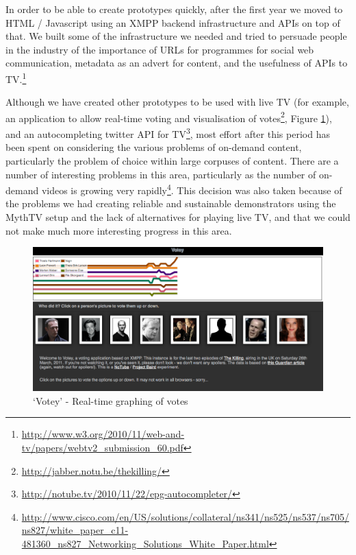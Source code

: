 \documentclass{notube}
\begin{document}
In order to be able to create prototypes quickly, after the first year we moved to HTML / Javascript using an XMPP backend infrastructure and APIs on top of that. We built some of the infrastructure we needed and tried to persuade people in the industry of the importance of URLs for programmes for social web communication, metadata as an advert for content, and the usefulness of APIs to TV.\footnote{\url{http://www.w3.org/2010/11/web-and-tv/papers/webtv2_submission_60.pdf}}

Although we have created other prototypes to be used with live TV (for example, an application to allow real-time voting and visualisation of votes\footnote{\url{http://jabber.notu.be/thekilling/}}, Figure \ref{fig:votey}), and an autocompleting twitter API for TV\footnote{\url{http://notube.tv/2010/11/22/epg-autocompleter/}}, most effort after this period has been spent on considering the various problems of on-demand content, particularly the problem of choice within large corpuses of content. There are a number of interesting problems in this area, particularly as the number of on-demand videos is growing very rapidly\footnote{\url{http://www.cisco.com/en/US/solutions/collateral/ns341/ns525/ns537/ns705/ns827/white_paper_c11-481360_ns827_Networking_Solutions_White_Paper.html}}. This decision was also taken because of the problems we had creating reliable and sustainable demonstrators using the MythTV setup and the lack of alternatives for playing live TV, and that we could not make much more interesting progress in this area.


\begin{figure}[htbp]
\begin{center}
\includegraphics[width=6in]{images/votey.png}
\caption{`Votey' - Real-time graphing of votes} \label{fig:votey}
\end{center}
\end{figure} 
\end{document}
